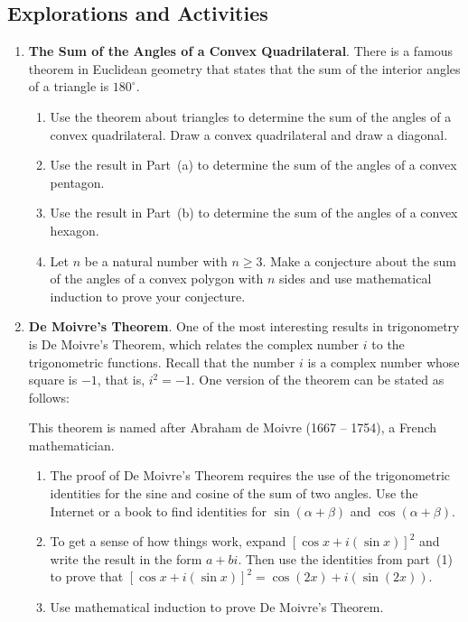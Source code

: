 \subsection*{Explorations and Activities}
\setcounter{oldenumi}{\theenumi}
\begin{enumerate} \setcounter{enumi}{\theoldenumi}
\item \textbf{The Sum of the Angles of a Convex Quadrilateral}.  There is a famous theorem in Euclidean geometry that states that the sum of the interior angles of a triangle is $180^\circ$.
\label{exer:convexquads}%

\begin{enumerate}
\item Use the theorem about triangles to determine the sum of the angles of a convex quadrilateral. \hint Draw a convex quadrilateral and draw a diagonal.

\item Use the result in Part~(a) to determine the sum of the angles of a convex pentagon.

\item Use the result in Part~(b) to determine the sum of the angles of a convex hexagon.

\item Let $n$ be a natural number with $n \geq 3$.  Make a conjecture about the sum of the angles of a convex polygon with $n$ sides and use mathematical induction to prove your conjecture.
\end{enumerate}


\item \textbf{De Moivre's Theorem}.  
%
One of the most interesting results in trigonometry is De Moivre's Theorem, which relates the complex number $i$ to the trigonometric functions.  Recall that the number $i$ is a complex number whose square is $-1$, that is, $i^2 = -1$.  One version of the theorem can be stated as follows:
This theorem is named after Abraham de Moivre
%
 (1667 -- 1754), a French mathematician.

\begin{enumerate}
  \item The proof of De Moivre's Theorem requires the use of the trigonometric identities for the sine and cosine of the sum of two angles.  Use the Internet or a book to find identities for $\sin( \alpha + \beta)$ and 
$\cos (\alpha + \beta)$.
  \item To get a sense of how things work, expand $\left[ {\cos x + i(\sin x)} \right]^2$ and write the result in the form $a + bi$.  Then use the identities from part~(1) to prove that 
$\left[ {\cos x + i(\sin x)} \right]^2  = \cos (2x) + i( {\sin (2x)} )$.
  \item Use mathematical induction to prove De Moivre's Theorem.
\end{enumerate}

\end{enumerate}


\hbreak



\endinput
